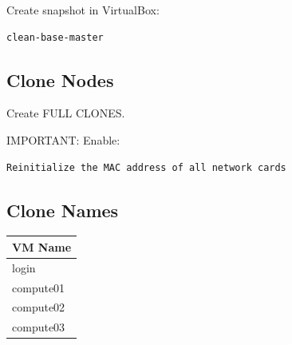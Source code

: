 \documentclass[11pt]{article}
\begin{document}
Create snapshot in VirtualBox:

\begin{verbatim}
clean-base-master
\end{verbatim}
\subsection{Clone Nodes}
\label{sec:org427c244}

Create FULL CLONES.

IMPORTANT:
Enable:

\begin{verbatim}
Reinitialize the MAC address of all network cards
\end{verbatim}
\subsection{Clone Names}
\label{sec:org9b5e940}

\begin{center}
\begin{tabular}{l}
VM Name\\
\hline
login\\
compute01\\
compute02\\
compute03\\
\end{tabular}
\end{center}
\end{document}
